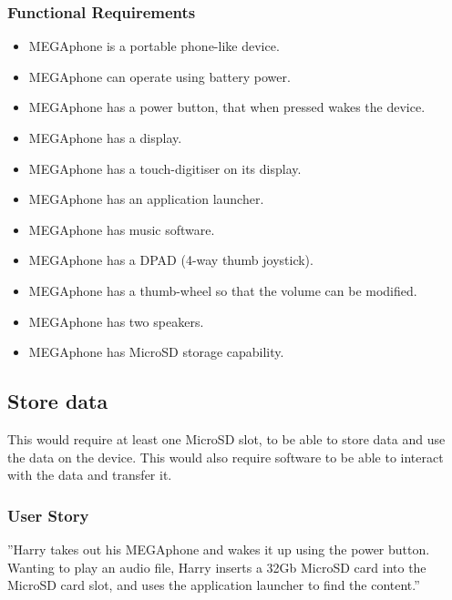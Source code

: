         \subsubsection{Functional Requirements}
        \begin{itemize}
        \item MEGAphone is a portable phone-like device.
        \item MEGAphone can operate using battery power.
        \item MEGAphone has a power button, that when pressed wakes the device.
        \item MEGAphone has a display.
        \item MEGAphone has a touch-digitiser on its display.
        \item MEGAphone has an application launcher.
        \item MEGAphone has music software.
        \item MEGAphone has a DPAD (4-way thumb joystick).
	\item MEGAphone has a thumb-wheel so that the volume can be modified.
	\item MEGAphone has two speakers.
	\item MEGAphone has MicroSD storage capability.
        \end{itemize}

\subsection{Store data}
	This would require at least one MicroSD slot, to be able to store data and use the data on the device. This would also require software to be able to interact with the data and transfer it.\\

	\subsubsection{User Story}
	''Harry takes out his MEGAphone and wakes it up using the power button. Wanting to play an audio file, Harry inserts a 32Gb MicroSD card into the MicroSD card slot, and uses the application launcher to find the content.''

